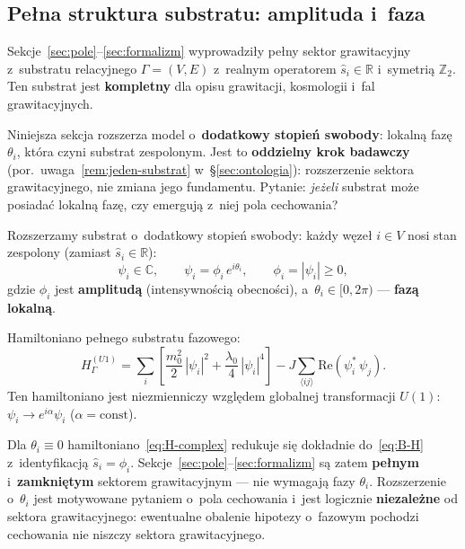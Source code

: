 \subsection{Pe\l{}na struktura substratu: amplituda i~faza}%
\label{ssec:complex-substrate}

Sekcje~\ref{sec:pole}--\ref{sec:formalizm} wyprowadzi\l{}y
pe\l{}ny sektor grawitacyjny z~substratu relacyjnego $\Gamma = (V,E)$
z~realnym operatorem $\hat{s}_i \in \mathbb{R}$ i~symetri\k{a} $\mathbb{Z}_2$.
Ten substrat jest \textbf{kompletny} dla opisu grawitacji,
kosmologii i~fal grawitacyjnych.

Niniejsza sekcja rozszerza model o~\textbf{dodatkowy stopie\'n swobody}:
lokaln\k{a} faz\k{e} $\theta_i$, kt\'ora czyni substrat zespolonym.
Jest to \textbf{oddzielny krok badawczy} (por.\ uwaga~\ref{rem:jeden-substrat}
w~\S\ref{sec:ontologia}): rozszerzenie sektora grawitacyjnego,
nie zmiana jego fundamentu.
Pytanie: \emph{je\.zeli} substrat mo\.ze posiada\'c lokaln\k{a} faz\k{e},
czy emerguj\k{a} z~niej pola cechowania?

\begin{axiom}%
\label{ax:complex-substrate}
Rozszerzamy substrat o~dodatkowy stopie\'n swobody:
ka\.zdy w\k{e}ze\l{} $i \in V$ nosi stan zespolony
(zamiast $\hat{s}_i \in \mathbb{R}$):
\begin{equation}\label{eq:complex-state}
    \psi_i \in \mathbb{C},
    \qquad
    \psi_i = \phi_i\, e^{i\theta_i},
    \qquad
    \phi_i = |\psi_i| \geq 0,
\end{equation}
gdzie $\phi_i$ jest \textbf{amplitudą} (intensywnością obecności),
a~$\theta_i \in [0, 2\pi)$ --- \textbf{fazą lokalną}.
\end{axiom}

Hamiltoniano pełnego substratu fazowego:
\begin{equation}\label{eq:H-complex}
    H_\Gamma^{(U1)} = \sum_i \left[
        \frac{m_0^2}{2}\,|\psi_i|^2
        + \frac{\lambda_0}{4}\,|\psi_i|^4
    \right]
    - J\sum_{\langle ij\rangle} \mathrm{Re}\!\left(
        \psi_i^*\,\psi_j
    \right).
\end{equation}
Ten hamiltoniano jest niezmienniczy względem globalnej transformacji
$U(1)$: $\psi_i \to e^{i\alpha}\psi_i$ ($\alpha = \mathrm{const}$).

\begin{remark}\label{rem:amplitude-sector}
Dla $\theta_i \equiv 0$ hamiltoniano~\eqref{eq:H-complex}
redukuje si\k{e} dok\l{}adnie do~\eqref{eq:B-H} z~identyfikacj\k{a}
$\hat{s}_i = \phi_i$.
Sekcje~\ref{sec:pole}--\ref{sec:formalizm} s\k{a} zatem
\textbf{pe\l{}nym} i~\textbf{zamkni\k{e}tym} sektorem grawitacyjnym
--- nie wymagaj\k{a} fazy $\theta_i$.
Rozszerzenie o~$\theta_i$ jest motywowane pytaniem
o~pola cechowania i~jest logicznie \textbf{niezale\.zne}
od sektora grawitacyjnego: ewentualne obalenie hipotezy
o~fazowym pochodzi cechowania nie niszczy sektora grawitacyjnego.
\end{remark}

